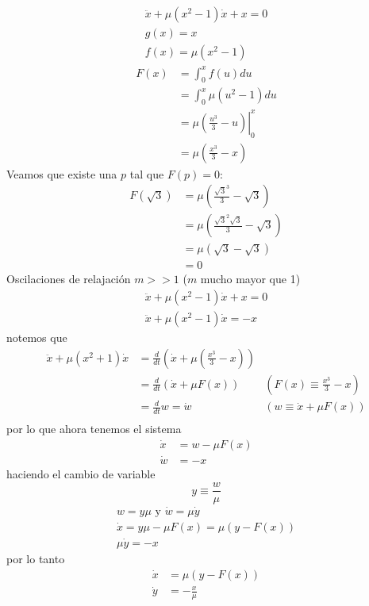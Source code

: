 \begin{ejemplo} \label{ecuacionesLieeje2}  
	\begin{gather*}
		\ddot{x} + \mu(x^2-1)\dot{x} + x = 0 \\
		g(x) = x \\
		f(x) = \mu(x^2-1)
	\end{gather*}
	\begin{align*}
	  F(x) &= \int_{0}^{x} f(u) du  \\
		&= \int_{0}^{x} \mu(u^2-1) d{u}   \\
		&= \left.  \mu \left( \frac{u^3}{3}-u \right)  \right|_{0}^{x}  \\
		&= \mu \left( \frac{x^3}{3}-x \right)
	\end{align*}
	Veamos que existe una $p$ tal que  $F(p)=0$:
	\begin{align*}                                               
		F \left( \sqrt{3} \right)  &= \mu \left( \frac{\sqrt{3}^3}{3}- \sqrt{3} \right) \\
															 &= \mu \left( \frac{\sqrt{3}^2 \sqrt{3}}{3} - \sqrt{3} \right) \\
															 &= \mu \left( \sqrt{3}-\sqrt{3} \right)  \\
															 &= 0
	\end{align*}
	Oscilaciones de relajación $m >{}>1$ ($m$ mucho mayor que 1)
	 \begin{gather*}
		\ddot{x}+\mu(x^2-1)\dot{x}+x = 0 \\
		\ddot{x} + \mu(x^2-1)\dot{x} = -x
	\end{gather*}
	notemos que
	\begin{align*}
		\ddot{x} + \mu(x^2+1)\dot{x} &= \frac{d}{dt}\left( \dot{x} + \mu \left( \frac{x^3}{3}-x \right)  \right) & \\
																 &= \frac{d}{dt} (\dot{x}+\mu F(x)) & \left(F(x) \equiv  \frac{x^3}{3}-x \right)  \\
																 &= \frac{d}{dt}w = \dot{w} & \left( w \equiv  \dot{x}+\mu F(x) \right) \\
	\end{align*}
	por lo que ahora tenemos el sistema
	\begin{align*}
	  \dot{x} &= w -\mu F(x) \\
		\dot{w} &= -x
	\end{align*}
	haciendo el cambio de variable $$
	y \equiv \frac{w}{\mu}
	$$
	\begin{gather*}
	  w =y\mu \text{ y } \dot{w}=\mu \dot{y} \\
		\dot{x} = y\mu - \mu F(x) = \mu(y- F(x)) \\
		\mu\dot{y} =-x
	\end{gather*}
	por lo tanto
	\begin{align*}
	  \dot{x} &= \mu(y-F(x)) \\
		\dot{y} &= -\frac{x}{\mu} \\ 
	\end{align*}


\end{ejemplo}
